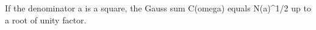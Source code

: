 If the denominator a is a square, the Gauss sum C(omega) equals N(a)^{1/2} up to a root of unity factor.
